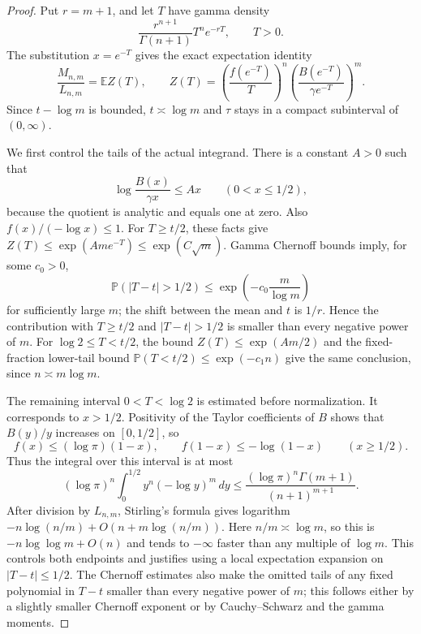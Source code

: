 \documentclass[11pt,letterpaper]{article}
\numberwithin{equation}{section}
\theoremstyle{plain}
\theoremstyle{definition}
\theoremstyle{remark}
\begin{document}
\begin{proof}
Put $r=m+1$, and let $T$ have gamma density
\[
 \frac{r^{n+1}}{\Gamma(n+1)}T^n e^{-rT},\qquad T>0.
\]
The substitution $x=e^{-T}$ gives the exact expectation identity
\begin{equation}\label{cont26:joint:eq:gamma-expectation}
 \frac{M_{n,m}}{L_{n,m}}=\mathbb E Z(T),\qquad
 Z(T)=\left(\frac{f(e^{-T})}{T}\right)^n
       \left(\frac{B(e^{-T})}{\gamma e^{-T}}\right)^m.
\end{equation}
Since $t-\log m$ is bounded, $t\asymp\log m$ and $\tau$ stays in
a compact subinterval of $(0,\infty)$.

We first control the tails of the actual integrand.  There is a
constant $A>0$ such that
\[
 \log\frac{B(x)}{\gamma x}\le Ax\qquad(0<x\le1/2),
\]
because the quotient is analytic and equals one at zero.
Also $f(x)/(-\log x)\le1$.
For $T\ge t/2$, these facts give
$Z(T)\le\exp(A m e^{-T})\le\exp(C\sqrt m)$.
Gamma Chernoff bounds imply, for some $c_0>0$,
\[
 \mathbb P(|T-t|>1/2)\le
 \exp\left(-c_0\frac m{\log m}\right)
\]
for sufficiently large $m$; the shift between the mean and $t$ is
$1/r$.  Hence the contribution with $T\ge t/2$ and $|T-t|>1/2$
is smaller than every negative power of $m$.
For $\log2\le T<t/2$, the bound
$Z(T)\le\exp(A m/2)$ and the fixed-fraction lower-tail bound
$\mathbb P(T<t/2)\le\exp(-c_1 n)$ give the same conclusion,
since $n\asymp m\log m$.

The remaining interval $0<T<\log2$ is estimated before normalization.
It corresponds to $x>1/2$.  Positivity of the Taylor coefficients of
$B$ shows that $B(y)/y$ increases on $[0,1/2]$, so
\[
 f(x)\le(\log\pi)(1-x),\qquad
 f(1-x)\le-\log(1-x)\qquad(x\ge1/2).
\]
Thus the integral over this interval is at most
\begin{equation}\label{cont26:joint:eq:opposite-tail}
 (\log\pi)^n\int_0^{1/2}y^n(-\log y)^m\,dy
 \le\frac{(\log\pi)^n\Gamma(m+1)}{(n+1)^{m+1}}.
\end{equation}
After division by $L_{n,m}$, Stirling's formula gives logarithm
$-n\log(n/m)+O(n+m\log(n/m))$.
Here $n/m\asymp\log m$, so this is
$-n\log\log m+O(n)$ and tends to $-\infty$ faster than
any multiple of $\log m$.  This controls both endpoints and
justifies using a local expectation expansion on $|T-t|\le1/2$.
The Chernoff estimates also make the omitted tails of any fixed
polynomial in $T-t$ smaller than every negative power of $m$;
this follows either by a slightly smaller Chernoff exponent or by
Cauchy--Schwarz and the gamma moments.


\end{proof}
\end{document}
